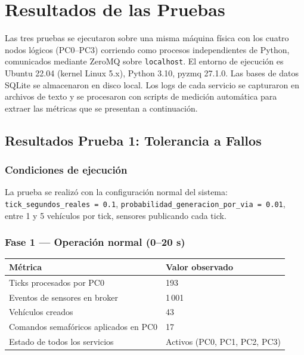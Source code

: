\documentclass[12pt, a4paper]{article}
\begin{document}

\section{Resultados de las Pruebas}

Las tres pruebas se ejecutaron sobre una misma máquina física con los cuatro nodos lógicos (PC0--PC3) corriendo como procesos independientes de Python, comunicados mediante ZeroMQ sobre \texttt{localhost}. El entorno de ejecución es Ubuntu 22.04 (kernel Linux 5.x), Python 3.10, pyzmq 27.1.0. Las bases de datos SQLite se almacenaron en disco local. Los logs de cada servicio se capturaron en archivos de texto y se procesaron con scripts de medición automática para extraer las métricas que se presentan a continuación.

\subsection{Resultados Prueba 1: Tolerancia a Fallos}

\subsubsection{Condiciones de ejecución}

La prueba se realizó con la configuración normal del sistema: \texttt{tick\_segundos\_reales = 0.1}, \texttt{probabilidad\_generacion\_por\_via = 0.01}, entre 1 y 5 vehículos por tick, sensores publicando cada tick.

\subsubsection{Fase 1 --- Operación normal (0--20 s)}

\begin{longtable}{|p{5cm}|p{8.5cm}|}
\hline
\rowcolor{gray!20}
\textbf{Métrica} & \textbf{Valor observado} \\
\hline
Ticks procesados por PC0 & 193 \\
\hline
Eventos de sensores en broker & 1\,001 \\
\hline
Vehículos creados & 43 \\
\hline
Comandos semafóricos aplicados en PC0 & 17 \\
\hline
Estado de todos los servicios & Activos (PC0, PC1, PC2, PC3) \\
\hline
\end{longtable}
\end{document}
